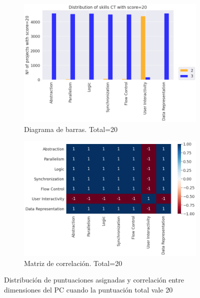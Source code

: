 \documentclass[a4paper, 12pt]{book}
\begin{document}
\begin{figure}[H]
    \centering
    \begin{subfigure}[h]{.49\textwidth} 
        \includegraphics[width=\textwidth]{img/distribucion_20_Scratch}
        \caption{Diagrama de barras. Total=20}
        \label{fig:total20}
    \end{subfigure}       
    \begin{subfigure}[h]{.49\textwidth} 
        \includegraphics[width=\textwidth]{img/corr_20_Scratch}
        \caption{Matriz de correlación. Total=20}
        \label{fig:corr20}
    \end{subfigure}
     \caption{Distribución de puntuaciones asignadas y correlación entre dimensiones del PC cuando la puntuación total vale 20}
\end{figure}
\end{document}
